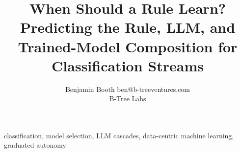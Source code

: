 \documentclass[twoside,11pt]{article}
\title{When Should a Rule Learn? Predicting the Rule, LLM, and Trained-Model Composition for Classification Streams}
\author{\name Benjamin Booth \email ben@b-treeventures.com \\
       \addr B-Tree Labs}
\begin{document}
\maketitle
\begin{abstract}%

\end{abstract}
\begin{keywords}
  classification, model selection, LLM cascades, data-centric machine learning, graduated autonomy
\end{keywords}

\end{document}
